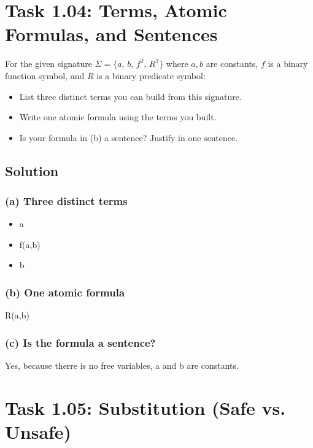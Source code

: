 \documentclass[11pt,a4paper]{article}
\newenvironment{solution}{%
	\begin{tcolorbox}[
		breakable,
		colback=green!4,
		colframe=green!50!black,
		fonttitle=\bfseries,
		title={ Solution},
		left=6pt, right=6pt, top=4pt, bottom=4pt
		]%
	}{%
	\end{tcolorbox}%
}
\begin{document}
\section*{Task 1.04: Terms, Atomic Formulas, and Sentences}

For the given signature $\Sigma = \{a,\, b,\, f^2,\, R^2\}$ where $a,b$ are constants, $f$ is a binary function symbol, and $R$ is a binary predicate symbol:

\begin{itemize}[itemindent=1em]
	\item List three distinct terms you can build from this signature.
	\item Write one atomic formula using the terms you built.
	\item Is your formula in (b) a sentence? Justify in one sentence.
\end{itemize}

\subsection*{Solution}
\begin{solution}
	\subsubsection*{(a) Three distinct terms}
	  \begin{itemize}
	      \item a
	      \item f(a,b)
	      \item b
	  \end{itemize}

	\subsubsection*{(b) One atomic formula}
	R(a,b)

	\subsubsection*{(c) Is the formula a sentence?}
	  Yes, because therre is no free variables, a and b are constants. 
\end{solution}

\section*{Task 1.05: Substitution (Safe vs. Unsafe)}
\end{document}
